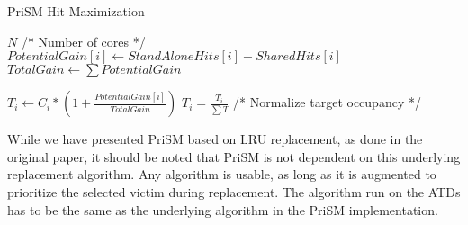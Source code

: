 \begin{algorithm}[ht]
\caption{PriSM Hit Maximization}
\label{alg:algorithms:prism}
\begin{algorithmic}[1]
\State $N$ /* Number of cores */
    \State $PotentialGain[i]\gets StandAloneHits[i] - SharedHits[i]$
\EndFor
\State $TotalGain\gets \sum{PotentialGain}$

    \State $T_i\gets C_i * (1 + \frac{PotentialGain[i]}{TotalGain})$
\EndFor
\State $T_i = \frac{T_i}{\sum{T}}$ /* Normalize target occupancy */
\end{algorithmic}
\end{algorithm}

While we have presented PriSM based on LRU replacement, as done in the original paper, it should be noted that PriSM is not dependent on this underlying replacement algorithm.
Any algorithm is usable, as long as it is augmented to prioritize the selected victim during replacement.
The algorithm run on the ATDs has to be the same as the underlying algorithm in the PriSM implementation.
